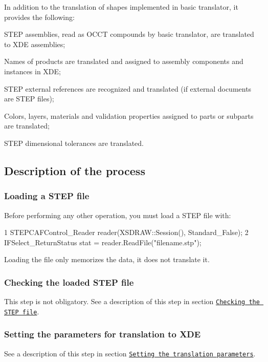 In addition to the translation of shapes implemented in basic translator, it provides the following\+:
\begin{DoxyItemize}
\item S\+T\+EP assemblies, read as O\+C\+CT compounds by basic translator, are translated to X\+DE assemblies;
\item Names of products are translated and assigned to assembly components and instances in X\+DE;
\item S\+T\+EP external references are recognized and translated (if external documents are S\+T\+EP files);
\item Colors, layers, materials and validation properties assigned to parts or subparts are translated;
\item S\+T\+EP dimensional tolerances are translated.
\end{DoxyItemize}\hypertarget{occt_user_guides__step_occt_step_7_1}{}\subsection{Description of the process}\label{occt_user_guides__step_occt_step_7_1}
\hypertarget{occt_user_guides__step_occt_step_7_1_1}{}\subsubsection{Loading a S\+T\+E\+P file}\label{occt_user_guides__step_occt_step_7_1_1}
Before performing any other operation, you must load a S\+T\+EP file with\+: 
\begin{DoxyCode}
1 STEPCAFControl\_Reader reader(XSDRAW::Session(), Standard\_False); 
2 IFSelect\_ReturnStatus stat = reader.ReadFile("filename.stp"); 
\end{DoxyCode}
 Loading the file only memorizes the data, it does not translate it.\hypertarget{occt_user_guides__step_occt_step_7_1_2}{}\subsubsection{Checking the loaded S\+T\+E\+P file}\label{occt_user_guides__step_occt_step_7_1_2}
This step is not obligatory. See a description of this step in section \href{#occt_step_2_3_2}{\tt Checking the S\+T\+EP file}.\hypertarget{occt_user_guides__step_occt_step_7_1_3}{}\subsubsection{Setting the parameters for translation to X\+DE}\label{occt_user_guides__step_occt_step_7_1_3}
See a description of this step in section \href{#occt_step_2_3_3}{\tt Setting the translation parameters}.

